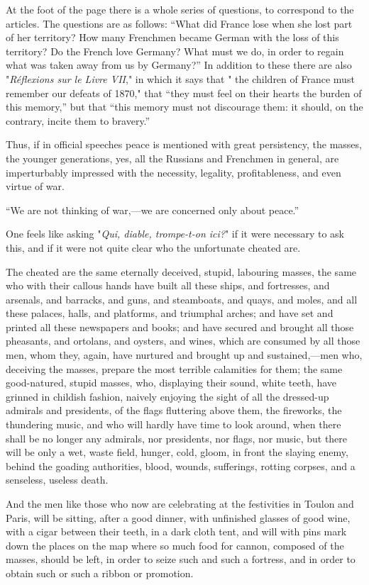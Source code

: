 \documentclass{book}
\begin{document}
At the foot of the page there is a whole series of questions, to correspond to the articles. The questions are as follows: “What did France lose when she lost part of her territory? How many Frenchmen became German with the loss of this territory? Do the French love Germany? What must we do, in order to regain what was taken away from us by Germany?” In addition to these there are also "\emph{Réflexions sur le Livre VII}," in which it says that " the children of France must remember our defeats of 1870," that “they must feel on their hearts the burden of this memory,” but that “this memory must not discourage them: it should, on the contrary, incite them to bravery.”

Thus, if in official speeches peace is mentioned with great persistency, the masses, the younger generations, yes, all the Russians and Frenchmen in general, are imperturbably impressed with the necessity, legality, profitableness, and even virtue of war.

“We are not thinking of war,—we are concerned only about peace.”

One feels like asking "\emph{Qui, diable, trompe-t-on ici?}" if it were necessary to ask this, and if it were not quite clear who the unfortunate cheated are.

The cheated are the same eternally deceived, stupid, labouring masses, the same who with their callous hands have built all these ships, and fortresses, and arsenals, and barracks, and guns, and steamboats, and quays, and moles, and all these palaces, halls, and platforms, and triumphal arches; and have set and printed all these newspapers and books; and have secured and brought all those pheasants, and ortolans, and oysters, and wines, which are consumed by all those men, whom they, again, have nurtured and brought up and sustained,—men who, deceiving the masses, prepare the most terrible calamities for them; the same good-natured, stupid masses, who, displaying their sound, white teeth, have grinned in childish fashion, naively enjoying the sight of all the dressed-up admirals and presidents, of the flags fluttering above them, the fireworks, the thundering music, and who will hardly have time to look around, when there shall be no longer any admirals, nor presidents, nor flags, nor music, but there will be only a wet, waste field, hunger, cold, gloom, in front the slaying enemy, behind the goading authorities, blood, wounds, sufferings, rotting corpses, and a senseless, useless death.

And the men like those who now are celebrating at the festivities in Toulon and Paris, will be sitting, after a good dinner, with unfinished glasses of good wine, with a cigar between their teeth, in a dark cloth tent, and will with pins mark down the places on the map where so much food for cannon, composed of the masses, should be left, in order to seize such and such a fortress, and in order to obtain such or such a ribbon or promotion.
\end{document}
